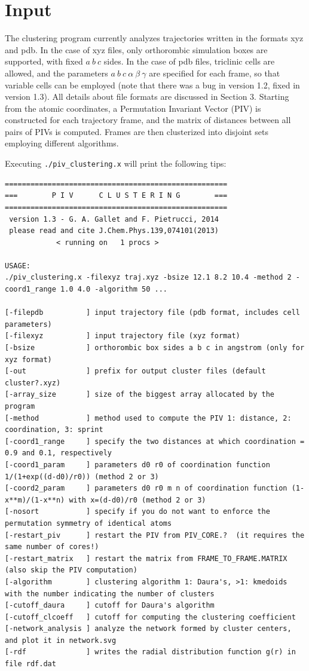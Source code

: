 \documentclass[a4paper,11pt]{article}
\begin{document}
\section{Input}
  The clustering program currently analyzes trajectories written in the formats xyz and pdb.
  In the case of xyz files, only orthorombic simulation boxes are supported, with fixed $a\ b\ c$ sides.
  In the case of pdb files, triclinic cells are allowed, and the parameters $a\ b\ c\ \alpha\ \beta\ \gamma$ 
  are specified for each frame, so that variable cells can be employed
  (note that there was a bug in version 1.2, fixed in version 1.3). 
  All details about file formats 
  are discussed in Section 3. Starting from the atomic coordinates, a Permutation Invariant Vector (PIV)
  is constructed for each trajectory frame, and the matrix of distances between all pairs of PIVs is computed.
  Frames are then clusterized into disjoint sets employing different algorithms.

  Executing \texttt{./piv\_clustering.x} will print the following tips:
\begingroup\fontsize{8pt}{12pt}\selectfont
\begin{verbatim}
====================================================
===        P I V      C L U S T E R I N G        ===
====================================================
 version 1.3 - G. A. Gallet and F. Pietrucci, 2014  
 please read and cite J.Chem.Phys.139,074101(2013)  
            < running on   1 procs >
 
USAGE:
./piv_clustering.x -filexyz traj.xyz -bsize 12.1 8.2 10.4 -method 2 -coord1_range 1.0 4.0 -algorithm 50 ...

[-filepdb          ] input trajectory file (pdb format, includes cell parameters)
[-filexyz          ] input trajectory file (xyz format)
[-bsize            ] orthorombic box sides a b c in angstrom (only for xyz format)
[-out              ] prefix for output cluster files (default cluster?.xyz)
[-array_size       ] size of the biggest array allocated by the program
[-method           ] method used to compute the PIV 1: distance, 2: coordination, 3: sprint
[-coord1_range     ] specify the two distances at which coordination = 0.9 and 0.1, respectively
[-coord1_param     ] parameters d0 r0 of coordination function 1/(1+exp((d-d0)/r0)) (method 2 or 3)
[-coord2_param     ] parameters d0 r0 m n of coordination function (1-x**m)/(1-x**n) with x=(d-d0)/r0 (method 2 or 3)
[-nosort           ] specify if you do not want to enforce the permutation symmetry of identical atoms
[-restart_piv      ] restart the PIV from PIV_CORE.?  (it requires the same number of cores!)
[-restart_matrix   ] restart the matrix from FRAME_TO_FRAME.MATRIX (also skip the PIV computation)
[-algorithm        ] clustering algorithm 1: Daura's, >1: kmedoids with the number indicating the number of clusters
[-cutoff_daura     ] cutoff for Daura's algorithm
[-cutoff_clcoeff   ] cutoff for computing the clustering coefficient
[-network_analysis ] analyze the network formed by cluster centers, and plot it in network.svg
[-rdf              ] writes the radial distribution function g(r) in file rdf.dat              
\end{verbatim}
\endgroup
\end{document}
